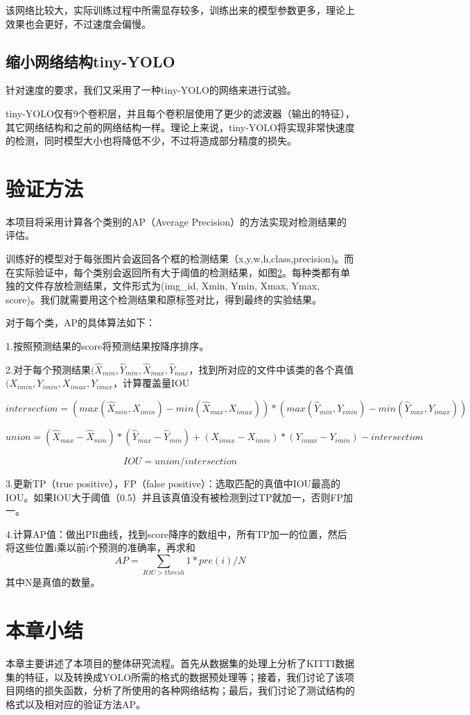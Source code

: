 {{	该网络比较大，实际训练过程中所需显存较多，训练出来的模型参数更多，理论上效果也会更好，不过速度会偏慢。
}

\subsection{缩小网络结构tiny-YOLO}{
	针对速度的要求，我们又采用了一种tiny-YOLO的网络来进行试验。

	tiny-YOLO仅有9个卷积层，并且每个卷积层使用了更少的滤波器（输出的特征），其它网络结构和之前的网络结构一样。理论上来说，tiny-YOLO将实现非常快速度的检测，同时模型大小也将降低不少，不过将造成部分精度的损失。
}
}

\section{验证方法}{
	本项目将采用计算各个类别的AP（Average Precision）的方法实现对检测结果的评估。

	训练好的模型对于每张图片会返回各个框的检测结果（x,y,w,h,class,precision)。而在实际验证中，每个类别会返回所有大于阈值的检测结果，如图\ref{}。每种类都有单独的文件存放检测结果，文件形式为(img_id, Xmin, Ymin, Xmax, Ymax, score)。我们就需要用这个检测结果和原标签对比，得到最终的实验结果。

	对于每个类，AP的具体算法如下：

	1.按照预测结果的score将预测结果按降序排序。

	2.对于每个预测结果$(\hat{X}_{min},\hat{Y}_{min},\hat{X}_{max},\hat{Y}_{max}$，找到所对应的文件中该类的各个真值$({X}_{imin},{Y}_{imin},{X}_{imax},{Y}_{imax}$，计算覆盖量IOU

	$$intersection = (max(\hat{X}_{min},{X}_{imin}) - min(\hat{X}_{max},{X}_{imax})) * (max(\hat{Y}_{min},{Y}_{imin}) - min(\hat{Y}_{max},{Y}_{imax}))$$

	$$union = (\hat{X}_{max} - \hat{X}_{min}) * (\hat{Y}_{max} - \hat{Y}_{min}) + ({X}_{imax} - {X}_{imin}) * ({Y}_{imax} - {Y}_{imin}) - intersection$$

	$$IOU = union / intersection$$

	3.更新TP（true positive），FP（false positive）：选取匹配的真值中IOU最高的IOU。如果IOU大于阈值（0.5）并且该真值没有被检测到过TP就加一，否则FP加一。

	4.计算AP值：做出PR曲线，找到score降序的数组中，所有TP加一的位置，然后将这些位置i乘以前i个预测的准确率，再求和
	$$AP = \sum_{IOU>thresh}1*pre(i) / N$$其中N是真值的数量。
}

\section{本章小结}{
	本章主要讲述了本项目的整体研究流程。首先从数据集的处理上分析了KITTI数据集的特征，以及转换成YOLO所需的格式的数据预处理等；接着，我们讨论了该项目网络的损失函数，分析了所使用的各种网络结构；最后，我们讨论了测试结构的格式以及相对应的验证方法AP。
}

